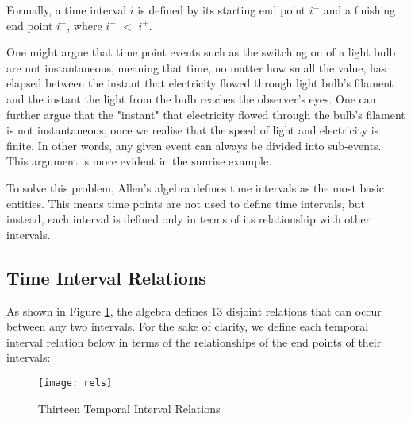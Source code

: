 \documentclass[11pt]{report}
\begin{document}
        Formally, a time interval $i$ is defined by its starting end point ${i^-}$ and
        a finishing end point ${i^+}$, where ${i^-}$ $<$ ${i^+}$.

        One might argue that time point events such as the switching on of a light bulb
        are not instantaneous, meaning that time, no matter how small the value, has
        elapsed between the instant that electricity flowed through light bulb's
        filament and the instant the light from the bulb reaches the observer's eyes.
        One can further argue that the "instant" that electricity flowed through the
        bulb's filament is not instantaneous, once we realise that the speed of light
        and electricity is finite. In other words, any given event can always be
        divided into sub-events. This argument is more evident in the sunrise example.

        To solve this problem, Allen's algebra defines time intervals as the most basic
        entities. This means time points are not used to define time intervals, but
        instead, each interval is defined only in terms of its relationship with other
        intervals.

      \subsection{Time Interval Relations}
        \label{subs-tempo-inrel}

        As shown in Figure \ref{figu-tempo-13rel}, the algebra defines 13
        disjoint relations that can occur between any two intervals. For
        the sake of clarity, we define each temporal interval relation
        below in terms of the relationships of the end points of their
        intervals:

        \begin{figure}[tbhp]
          \begin{center}
            \texttt{[image: rels]}
            \caption{Thirteen Temporal Interval Relations}
            \label{figu-tempo-13rel}
          \end{center}
        \end{figure}
\end{document}
